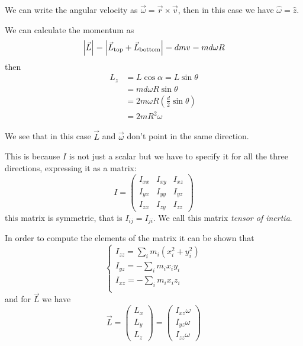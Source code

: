 \documentclass[14pt]{extarticle}
\begin{document}
We can write the angular velocity as $\vec{\omega} = \vec{r} \times \vec{v}$, then in this case we have $\hat \omega = \hat z$.

We can calculate the momentum as
\begin{equation}
    \abs{\vec L} = \abs{\vec{L}_{\text{top}} + \vec{L}_{\text{bottom}}} = dmv = md\omega R
\end{equation}
then
\begin{align}
    L_z & = L \cos \alpha = L \sin \theta                       \\
        & = md\omega R \sin \theta                              \\
        & = 2 m \omega R \left( \frac{d}{2} \sin \theta \right) \\
        & = 2m R^2 \omega
\end{align}

We see that in this case $\vec{L}$ and $\vec{\omega}$ don't point in the same direction.

This is because $I$ is not just a scalar but we have to specify it for all the three directions, expressing it as a matrix:
\begin{equation}
    I = \begin{pmatrix}
        I_{xx} & I_{xy} & I_{xz} \\
        I_{yx} & I_{yy} & I_{yz} \\
        I_{zx} & I_{zy} & I_{zz}
    \end{pmatrix}
\end{equation}
this matrix is symmetric, that is $I_{ij} = I_{ji}$. We call this matrix \emph{tensor of inertia}.

In order to compute the elements of the matrix it can be shown that
\begin{equation}
    \begin{cases}
        I_{zz} = \sum_i m_i (x_i^2 + y_i^2) \\
        I_{yz} = - \sum_i m_i x_i y_i       \\
        I_{xz} = - \sum_i m_i x_i z_i       \\
    \end{cases}
\end{equation}
and for $\vec{L}$ we have
\begin{equation}
    \vec{L} = \begin{pmatrix}
        L_x \\
        L_y \\
        L_z
    \end{pmatrix}
    =
    \begin{pmatrix}
        I_{xz} \omega \\
        I_{yz} \omega \\
        I_{zz} \omega
    \end{pmatrix}
\end{equation}
\end{document}
